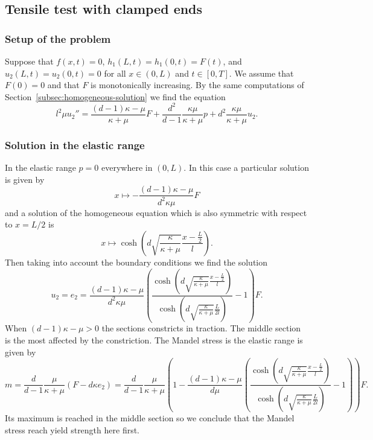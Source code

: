 \documentclass[a4paper,10pt,oneside]{amsbook}
\numberwithin{section}{chapter}
\numberwithin{equation}{chapter}
\theoremstyle{definition}
\begin{document}
\subsection{Tensile test with clamped ends}

\subsubsection*{Setup of the problem}

Suppose that $f(x,t)=0$, $h_1(L,t)=h_1(0,t)=F(t)$, and $u_2(L,t)=u_2(0,t)=0$ for all $x\in(0,L)$ and $t\in[0,T]$. We assume that $F(0)=0$ and that $F$ is monotonically increasing. By the same computations of Section~\ref{subsec:homogeneous-solution} we find the equation
\begin{equation}
\label{eqn:ode-u2}
l^2\mu u_2''=\frac{(d-1)\kappa-\mu}{\kappa+\mu}F+\frac{d^2}{d-1}\frac{\kappa\mu}{\kappa+\mu}p+d^2\frac{\kappa\mu}{\kappa+\mu}u_2.
\end{equation}

\subsubsection*{Solution in the elastic range}

In the elastic range $p=0$ everywhere in $(0,L)$. In this case a particular solution is given by
\[
x\mapsto-\frac{(d-1)\kappa-\mu}{d^2\kappa\mu}F
\]
and a solution of the homogeneous equation which is also symmetric with respect to $x=L/2$ is
\[
x\mapsto\cosh\left(d\sqrt{\frac{\kappa}{\kappa+\mu}}\frac{x-\frac{L}{2}}{l}\right).
\]
Then taking into account the boundary conditions we find the solution
\begin{equation}
\label{eqn:elastic-solution}
u_2=e_2=\frac{(d-1)\kappa-\mu}{d^2\kappa\mu}\left(\frac{\cosh\left(d\sqrt{\frac{\kappa}{\kappa+\mu}}\frac{x-\frac{L}{2}}{l}\right)}{\cosh\left(d\sqrt{\frac{\kappa}{\kappa+\mu}}\frac{L}{2l}\right)}-1\right)F.
\end{equation}
When $(d-1)\kappa-\mu>0$ the sections constricts in traction. The middle section is the most affected by the constriction. The Mandel stress is the elastic range is given by
\[
m=\frac{d}{d-1}\frac{\mu}{\kappa+\mu}(F-d\kappa e_2)=\frac{d}{d-1}\frac{\mu}{\kappa+\mu}\left(1-\frac{(d-1)\kappa-\mu}{d\mu}\left(\frac{\cosh\left(d\sqrt{\frac{\kappa}{\kappa+\mu}}\frac{x-\frac{L}{2}}{l}\right)}{\cosh\left(d\sqrt{\frac{\kappa}{\kappa+\mu}}\frac{L}{2l}\right)}-1\right)\right)F.
\]
Its maximum is reached in the middle section so we conclude that the Mandel stress reach yield strength here first.
\end{document}
